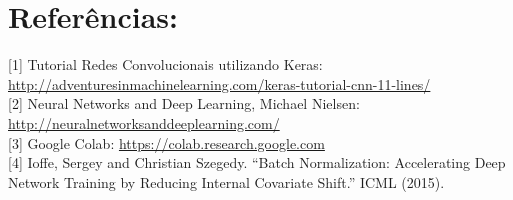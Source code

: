     \section{Referências:}\label{referencias}

[1] Tutorial Redes Convolucionais utilizando
Keras:
\href{http://adventuresinmachinelearning.com/keras-tutorial-cnn-11-lines/}{
http://adventuresinmachinelearning.com/keras-tutorial-cnn-11-lines/}\\

[2] Neural Networks and Deep Learning, Michael Nielsen:
\href{http://neuralnetworksanddeeplearning.com/}{http://neuralnetworksanddeeplearning.com/}\\

[3] Google Colab:
\href{https://colab.research.google.com}{https://colab.research.google.com}\\

[4] Ioffe, Sergey and Christian Szegedy. “Batch Normalization: Accelerating Deep Network Training by Reducing Internal Covariate Shift.” ICML (2015).

    
